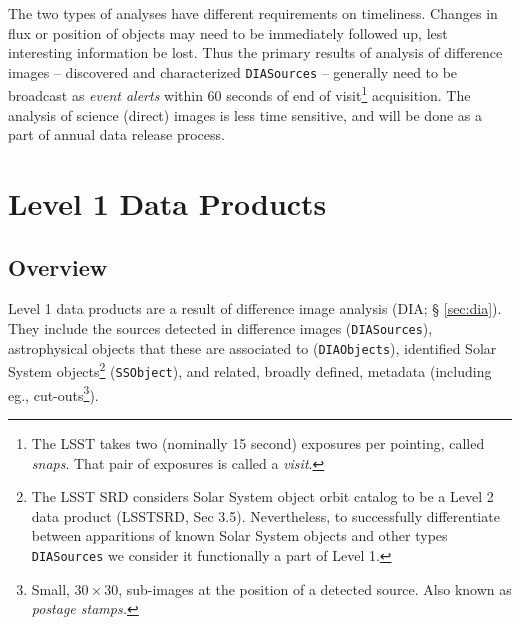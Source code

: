 \documentclass[12pt]{article}
\newcommand{\code}[1]{\texttt{#1}}
\newcommand{\DIASources}{\code{DIASources}\xspace}
\newcommand{\DIAObjects}{\code{DIAObjects}\xspace}
\newcommand{\SSObject}{\code{SSObject}\xspace}
\begin{document}
The two types of analyses have different requirements on timeliness. Changes
in flux or position of objects may need to be immediately followed up, lest
interesting information be lost. Thus the primary results of analysis of
difference images -- discovered and characterized \DIASources{} -- generally
need to be broadcast as {\em event alerts} within 60 seconds of end of
visit\footnote{The LSST takes two (nominally 15 second) exposures per
pointing, called {\em snaps}. That pair of exposures is called a {\em visit}.}
acquisition. The analysis of science (direct) images is less time sensitive,
and will be done as a part of annual data release process.



\section{Level 1 Data Products}

\subsection{Overview}

Level 1 data products are a result of difference image analysis (DIA; \S
\ref{sec:dia}). They include the sources detected in difference images
(\DIASources), astrophysical objects that these are associated to
(\DIAObjects), identified Solar System objects\footnote{The LSST SRD considers
Solar System object orbit catalog to be a Level 2 data product (LSSTSRD, Sec
3.5). Nevertheless, to successfully differentiate between apparitions of known
Solar System objects and other types \DIASources we consider it functionally a
part of Level 1.} (\SSObject), and related, broadly defined, metadata
(including eg., cut-outs\footnote{Small, $30 \times 30$, sub-images at the
position of a detected source. Also known as {\em postage stamps.}}).
\end{document}
